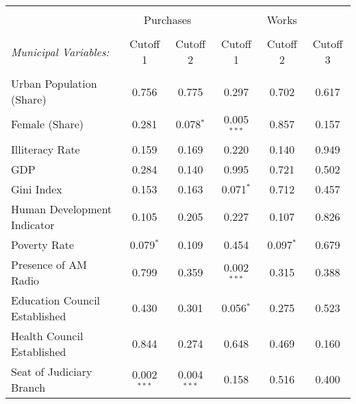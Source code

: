 \documentclass[border = 1pt$]{standalone}
\begin{document}
\scriptsize
\setlength{\tabcolsep}{-2pt}
\begin{tabular}{@{\extracolsep{6pt}}lccccc}
\\[-1.8ex]\hline
\hline \\[-1.8ex]
& \multicolumn{2}{c}{Purchases} & \multicolumn{3}{c}{Works} \\
\cline{2-3} \cline{4-6} \\[-1.8ex]
\emph{Municipal Variables:} & Cutoff 1 & Cutoff 2 & Cutoff 1 & Cutoff 2 & Cutoff 3 \\
\hline \\[-1.8ex]
Urban Population (Share)      & 0.756         & 0.775         & 0.297         & 0.702       & 0.617 \\[1.0ex]
Female (Share)                & 0.281         & \hspace{4pt}0.078$^{*}$   & \hspace{11pt}0.005$^{***}$ & 0.857       & 0.157 \\[1.0ex]
Illiteracy Rate               & 0.159         & 0.169         & 0.220         & 0.140       & 0.949 \\[1.0ex]
GDP                           & 0.284         & 0.140         & 0.995         & 0.721       & 0.502 \\[1.0ex]
Gini Index                    & 0.153         & 0.163         & \hspace{4pt}0.071$^{*}$   & 0.712       & 0.457 \\[1.0ex]
Human Development Indicator   & 0.105         & 0.205         & 0.227         & 0.107       & 0.826 \\[1.0ex]
Poverty Rate                  & \hspace{4pt}0.079$^{*}$   & 0.109         & 0.454         & \hspace{4pt}0.097$^{*}$ & 0.679 \\[1.0ex]
Presence of AM Radio          & 0.799         & 0.359         & \hspace{11pt}0.002$^{***}$ & 0.315       & 0.388 \\[1.0ex]
Education Council Established & 0.430         & 0.301         & \hspace{4pt}0.056$^{*}$   & 0.275       & 0.523 \\[1.0ex]
Health Council Established    & 0.844         & 0.274         & 0.648         & 0.469       & 0.160 \\[1.0ex]
Seat of Judiciary Branch      & \hspace{11pt}0.002$^{***}$ & \hspace{11pt}0.004$^{***}$ & 0.158         & 0.516       & 0.400 \\[1.0ex]

\end{tabular}
\end{document}

